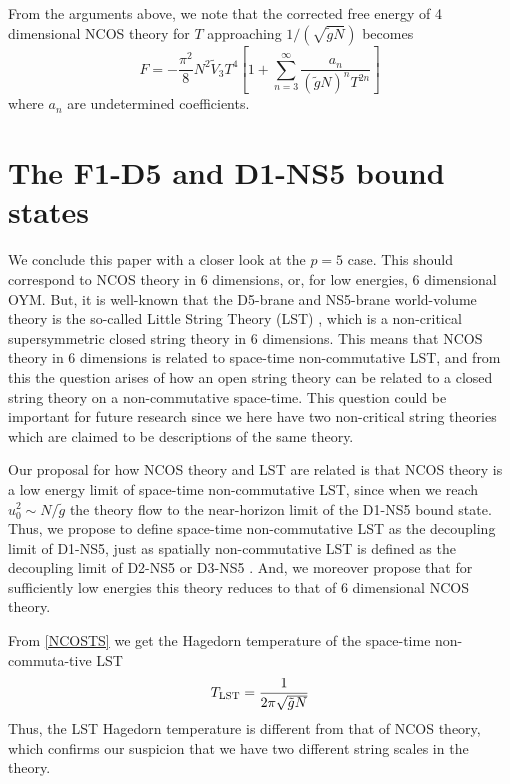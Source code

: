 \documentclass[a4paper,twoside,titlepage,12pt]{article}
\begin{document}
From the arguments above, we note that 
the corrected free energy of 4 dimensional NCOS theory
for $T$ approaching \( 1/(\sqrt{\tilde{g}N}) \) becomes
%
\begin{equation}
F = - \frac{\pi^2}{8} N^2 \tilde{V}_3 T^4 \left[
1+ \sum_{n=3}^\infty \frac{a_n}{(\tilde{g} N)^n T^{2n}}  \right]
\end{equation}
%
where \( a_n \) are undetermined coefficients.

\section{The F1-D5 and D1-NS5 bound states}
\label{secp5}


We conclude this paper with a closer look at the $p=5$ case. 
This should correspond to NCOS theory in 6 dimensions, or, for low
energies, 6 dimensional OYM. 
But, it is well-known that the D5-brane and NS5-brane world-volume
theory is the so-called Little String Theory (LST) 
\cite{Seiberg:1997zk,Berkooz:1997cq,Losev:1997hx}, which
is a non-critical supersymmetric closed string theory in 6 dimensions.
This means that NCOS theory in 6 dimensions is related to space-time
non-commutative LST, and from this the question arises 
of how an open string theory can be related to a closed string theory
on a non-commutative space-time.
This question could be important for future research since we here
have two non-critical string theories which are claimed
to be descriptions of the same theory. 


Our proposal for how NCOS theory and LST are related is that NCOS theory is a low energy
limit of space-time non-commutative LST, since when we reach 
\( u_0^2 \sim N/\tilde{g} \) the theory flow to the near-horizon
limit of the D1-NS5 bound state. 
Thus, we propose to define space-time non-commutative LST as the
decoupling limit of D1-NS5, just as spatially non-commutative LST
is defined as the decoupling limit of D2-NS5 or D3-NS5 
\cite{Alishahiha:2000er}.
And, we moreover propose that for sufficiently low energies this
theory reduces to that of 6 dimensional NCOS theory.


From \eqref{NCOSTS} we get the Hagedorn temperature
of the space-time non-commuta{-}tive LST
%
\begin{equation}
T_{\rm LST} = \frac{1}{2\pi\sqrt{\tilde{g}N} }
\end{equation}
%
Thus, the LST Hagedorn temperature is different from that of NCOS theory,
which confirms our suspicion that we have two different string scales
in the theory.
\end{document}
